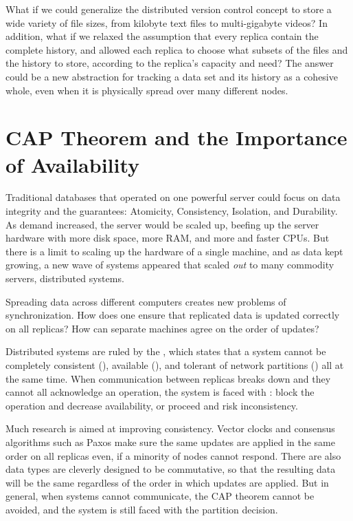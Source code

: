 What if we could generalize the distributed version control concept to store a
wide variety of file sizes, from kilobyte text files to multi-gigabyte videos?
In addition, what if we relaxed the assumption that every replica contain the
complete history, and allowed each replica to choose what subsets of the files
and the history to store, according to the replica's capacity and need? The
answer could be a new abstraction for tracking a data set and its history as a
cohesive whole, even when it is physically spread over many different nodes.

%



\section{CAP Theorem and the Importance of Availability}

Traditional databases that operated on one powerful server could focus on data
integrity and the  guarantees: Atomicity, Consistency, Isolation,
and Durability. As demand increased, the server would be scaled up, beefing up
the server hardware with more disk space, more RAM, and more and faster CPUs.
But there is a limit to scaling up the hardware of a single machine, and as data
kept growing, a new wave of systems appeared that scaled \emph{out} to many
commodity servers, distributed systems.

Spreading data across different computers creates new problems of
synchronization. How does one ensure that replicated data is updated correctly
on all replicas? How can separate machines agree on the order of updates?

Distributed systems are ruled by the  \cite{cap_origin},
which states that a system cannot be completely consistent (),
available (), and tolerant of network partitions () all at
the same time. When communication between replicas breaks down and they cannot
all acknowledge an operation, the system is faced with : block the operation and decrease availability, or proceed and risk
inconsistency\cite{cap_years_later}.

Much research is aimed at improving consistency. Vector
clocks\cite{lamport_ordering} and consensus algorithms such as
Paxos\cite{paxos_made_simple,paxos_made_moderately_complex} make sure the same
updates are applied in the same order on all replicas even, if a minority of
nodes cannot respond. There are also data types are cleverly designed to be
commutative, so that the resulting data will be the same regardless of the order
in which updates are applied\cite{crdt_orig}. But in general, when systems
cannot communicate, the CAP theorem cannot be avoided\cite{cap_proof}, and the
system is still faced with the partition decision.

